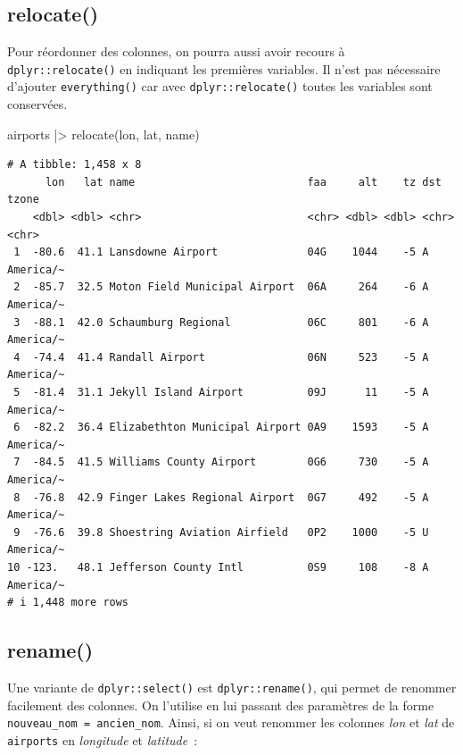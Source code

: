 \documentclass[
  letterpaper,
  DIV=11,
  numbers=noendperiod,
  oneside]{scrreprt}
\newenvironment{Shaded}{\begin{snugshade}}{\end{snugshade}}
\newcommand{\FunctionTok}[1]{\textcolor[rgb]{0.28,0.35,0.67}{#1}}
\newcommand{\NormalTok}[1]{\textcolor[rgb]{0.00,0.23,0.31}{#1}}
\newcommand{\SpecialCharTok}[1]{\textcolor[rgb]{0.37,0.37,0.37}{#1}}
\begin{document}
\hypertarget{relocate}{%
\subsection{relocate()}\label{relocate}}

Pour réordonner des colonnes, on pourra aussi avoir recours à
\texttt{dplyr::relocate()} en indiquant les premières variables. Il
n'est pas nécessaire d'ajouter \texttt{everything()} car avec
\texttt{dplyr::relocate()} toutes les variables sont conservées.

\begin{Shaded}
\begin{Highlighting}[]
\NormalTok{airports }\SpecialCharTok{|\textgreater{}} 
  \FunctionTok{relocate}\NormalTok{(lon, lat, name)}
\end{Highlighting}
\end{Shaded}

\begin{verbatim}
# A tibble: 1,458 x 8
      lon   lat name                           faa     alt    tz dst   tzone    
    <dbl> <dbl> <chr>                          <chr> <dbl> <dbl> <chr> <chr>    
 1  -80.6  41.1 Lansdowne Airport              04G    1044    -5 A     America/~
 2  -85.7  32.5 Moton Field Municipal Airport  06A     264    -6 A     America/~
 3  -88.1  42.0 Schaumburg Regional            06C     801    -6 A     America/~
 4  -74.4  41.4 Randall Airport                06N     523    -5 A     America/~
 5  -81.4  31.1 Jekyll Island Airport          09J      11    -5 A     America/~
 6  -82.2  36.4 Elizabethton Municipal Airport 0A9    1593    -5 A     America/~
 7  -84.5  41.5 Williams County Airport        0G6     730    -5 A     America/~
 8  -76.8  42.9 Finger Lakes Regional Airport  0G7     492    -5 A     America/~
 9  -76.6  39.8 Shoestring Aviation Airfield   0P2    1000    -5 U     America/~
10 -123.   48.1 Jefferson County Intl          0S9     108    -8 A     America/~
# i 1,448 more rows
\end{verbatim}

\hypertarget{rename}{%
\subsection{rename()}\label{rename}}

Une variante de \texttt{dplyr::select()} est
\texttt{dplyr::rename()}, qui permet de renommer facilement des
colonnes. On l'utilise en lui passant des paramètres de la forme
\texttt{nouveau\_nom\ =\ ancien\_nom}. Ainsi, si on veut renommer les
colonnes \emph{lon} et \emph{lat} de \texttt{airports} en
\emph{longitude} et \emph{latitude}~:
\end{document}
